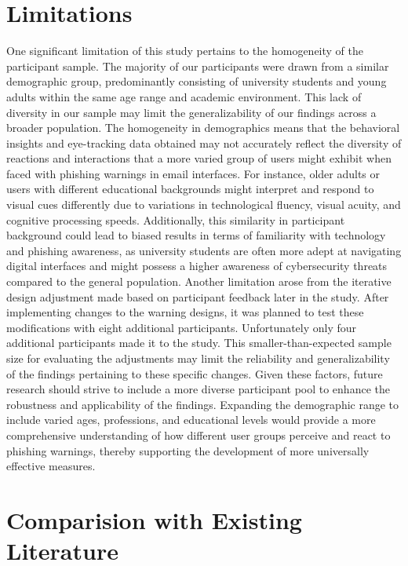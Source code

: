 \documentclass[
  a4paper,  %
  twoside,  %
  bibliography=totoc,
  headsepline,
  cleardoublepage=empty,
  parskip=half,
  draft=false
]{scrbook}
\begin{document}
\section{Limitations}
One significant limitation of this study pertains to the homogeneity of the participant sample. The majority of our participants were drawn from a similar demographic group, predominantly consisting of university students and young adults within the same age range and academic environment. This lack of diversity in our sample may limit the generalizability of our findings across a broader population. \newline
The homogeneity in demographics means that the behavioral insights and eye-tracking data obtained may not accurately reflect the diversity of reactions and interactions that a more varied group of users might exhibit when faced with phishing warnings in email interfaces. For instance, older adults or users with different educational backgrounds might interpret and respond to visual cues differently due to variations in technological fluency, visual acuity, and cognitive processing speeds. Additionally, this similarity in participant background could lead to biased results in terms of familiarity with technology and phishing awareness, as university students are often more adept at navigating digital interfaces and might possess a higher awareness of cybersecurity threats compared to the general population. \newline
Another limitation arose from the iterative design adjustment made based on participant feedback later in the study. After implementing changes to the warning designs, it was planned to test these modifications with eight additional participants. Unfortunately only four additional participants made it to the study. This smaller-than-expected sample size for evaluating the adjustments may limit the reliability and generalizability of the findings pertaining to these specific changes.\newline
Given these factors, future research should strive to include a more diverse participant pool to enhance the robustness and applicability of the findings. Expanding the demographic range to include varied ages, professions, and educational levels would provide a more comprehensive understanding of how different user groups perceive and react to phishing warnings, thereby supporting the development of more universally effective measures.

\section{Comparision with Existing Literature}
\end{document}
